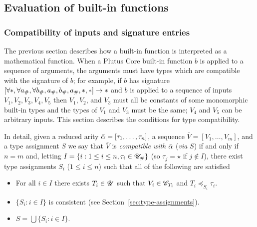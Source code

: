 \subsection{Evaluation of built-in functions}
\label{sec:builtin-evaluation}

\subsubsection{Compatibility of inputs and signature entries}
\label{sec:compatibility}
The previous section describes how a built-in function is interpreted as a
mathematical function.  When a Plutus Core built-in function $b$ is applied to a
sequence of arguments, the arguments must have types which are compatible with
the signature of $b$; for example, if $b$ has signature
$[\forallStar, \forall a_\#, \forall b_\#, a_\#, b_\#, a_\#, \star, \star] \rightarrow \star$ and $b$
is applied to a
sequence of inputs $V_1, V_2, V_3, V_4, V_5$ then $V_1, V_2$, and $V_3$ must all
be constants of some monomorphic built-in types and the types of $V_1$ and $V_3$
must be the same; $V_4$ and $V_5$ can be arbitrary inputs.  This section
describes the conditions for type compatibility.


\medskip
\noindent In detail, given a reduced arity $\bar{\alpha} = [\tau_1, \ldots,
  \tau_n]$, a sequence $\bar{V} = [V_1, \ldots, V_m]$, and a type assignment $S$
we say that $\bar{V}$ is \textit{compatible with} $\bar{\alpha}$ (\textit{via} $S$)
if and only if $n=m$ and, letting $I = \{i: 1 \leq i \leq n, \tau_i \in
{\mathscr{U}_{\#}}\}$ (so $\tau_j = \star$ if $j \notin I$), there exist type
assignments $S_i$ ($1 \leq i \leq n$) such that all of the following are
satisfied
\begin{itemize}
\item For all $i \in I$ there exists $T_i \in \mathscr{U}$ such that $V_i \in \mathscr{C}_{T_i}$ and $T_i \preceq_{S_i} \tau_i$.
\item $\{S_i: i \in I\}$ is consistent (see Section~\ref{sec:type-assignments}).
\item $S = \bigcup\{S_i: i \in I\}$.
\end{itemize}

